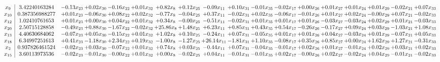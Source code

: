 \documentclass[9pt]{article}
\begin{document}
 \[\begin{array}{c| c c@{\hskip 2pt} c@{\hskip 2pt} c@{\hskip 2pt} c@{\hskip 2pt} c@{\hskip 2pt} c@{\hskip 2pt} c@{\hskip 2pt} c@{\hskip 2pt} c@{\hskip 2pt} c@{\hskip 2pt} c@{\hskip 2pt} c@{\hskip 2pt} c@{\hskip 2pt} c@{\hskip 2pt} c@{\hskip 2pt} c@{\hskip 2pt} }
 x_{9}   &  3.42240163284 & -0.13 x_{23} & +  0.02 x_{30} & -0.16 x_{22} & +  0.01 x_{32} & +  0.82 x_{8} & +  0.12 x_{25} & -0.09 x_{11} & +  0.10 x_{31} & -0.01 x_{35} & -0.02 x_{17} & +  0.00 x_{26} & +  0.01 x_{27} & +  0.01 x_{24} & +  0.01 x_{29} & -0.02 x_{21} & +  0.07 x_{33}\\
 x_{10}   &  0.387356988277 & +  0.01 x_{23} & -0.06 x_{30} & +  0.08 x_{22} & +  0.02 x_{32} & -0.77 x_{8} & -0.04 x_{25} & +  0.37 x_{11} & -0.02 x_{31} & +  0.02 x_{35} & -0.06 x_{17} & -0.01 x_{26} & +  0.01 x_{27} & +  0.02 x_{24} & -0.00 x_{29} & +  0.07 x_{21} & -0.02 x_{33}\\
 x_{12}   &  1.02410761653 & +  0.01 x_{23} & +  0.00 x_{30} & +  0.04 x_{22} & +  0.01 x_{32} & +  0.34 x_{8} & -0.00 x_{25} & -0.51 x_{11} & -0.02 x_{31} & +  0.01 x_{35} & +  0.01 x_{17} & +  0.01 x_{26} & -0.03 x_{27} & -0.03 x_{24} & +  0.02 x_{29} & +  0.01 x_{21} & -0.03 x_{33}\\
 x_{20}   &  2.50715128858 & -0.49 x_{23} & +  0.88 x_{30} & -1.67 x_{22} & -0.02 x_{32} & + 25.86 x_{8} & +  1.48 x_{25} & +  6.23 x_{11} & +  0.85 x_{31} & +  0.43 x_{35} & +  0.54 x_{17} & -0.26 x_{26} & -0.17 x_{27} & +  0.09 x_{24} & +  0.03 x_{29} & -1.03 x_{21} & +  1.08 x_{33}\\
 x_{13}   &  4.40630684062 & -0.07 x_{23} & +  0.05 x_{30} & -0.15 x_{22} & +  0.01 x_{32} & +  1.02 x_{8} & +  0.10 x_{25} & -0.24 x_{11} & +  0.07 x_{31} & -0.05 x_{35} & +  0.01 x_{17} & +  0.01 x_{26} & +  0.04 x_{27} & -0.03 x_{24} & +  0.01 x_{29} & -0.07 x_{21} & +  0.05 x_{33}\\
 x_{18}   &  6.34997251613 & +  0.41 x_{23} & -1.18 x_{30} & +  2.34 x_{22} & +  0.19 x_{32} & -1.00 x_{8} & -1.27 x_{25} & + 26.14 x_{11} & -1.81 x_{31} & +  1.10 x_{35} & -0.08 x_{17} & +  0.35 x_{26} & +  0.85 x_{27} & +  0.00 x_{24} & +  1.62 x_{29} & +  1.27 x_{21} & -0.31 x_{33}\\
 x_{2}   &  0.937826461524 & -0.02 x_{23} & +  0.03 x_{30} & -0.07 x_{22} & +  0.01 x_{32} & +  0.74 x_{8} & +  0.03 x_{25} & -0.44 x_{11} & +  0.07 x_{31} & -0.04 x_{35} & -0.01 x_{17} & +  0.02 x_{26} & +  0.01 x_{27} & -0.01 x_{24} & +  0.02 x_{29} & +  0.03 x_{21} & +  0.02 x_{33}\\
 x_{15}   &  3.60113973536 & -0.02 x_{23} & -0.01 x_{30} & -0.00 x_{22} & +  0.01 x_{32} & +  0.00 x_{8} & -0.02 x_{25} & +  0.04 x_{11} & -0.01 x_{31} & -0.01 x_{35} & +  0.02 x_{17} & -0.00 x_{26} & +  0.02 x_{27} & -0.02 x_{24} & +  0.04 x_{29} & -0.01 x_{21} & -0.02 x_{33}\\

\end{array}\]
\end{document}

